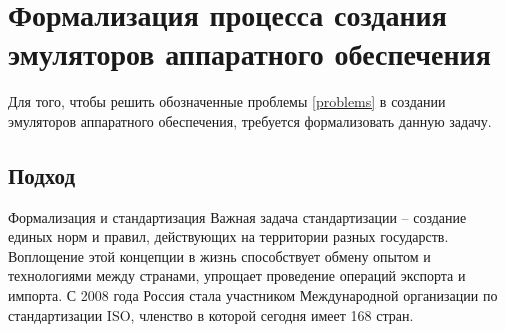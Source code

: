 \chapter{Формализация процесса создания эмуляторов аппаратного обеспечения}\label{ch:ch2}

Для того, чтобы решить обозначенные проблемы \ref{problems} в создании эмуляторов аппаратного обеспечения,
требуется формализовать данную задачу.

\section{Подход}\label{sec:ch2/sec1}
Формализация и стандартизация 
Важная задача стандартизации -- создание единых норм и правил,
действующих на территории разных государств.
Воплощение этой концепции в жизнь способствует обмену опытом и технологиями между странами,
упрощает проведение операций экспорта и импорта.
С 2008 года Россия стала участником Международной организации по стандартизации ISO,
членство в которой сегодня имеет 168 стран.
